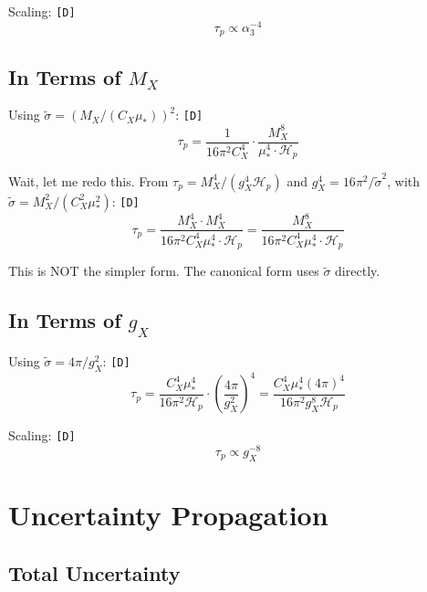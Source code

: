 \documentclass[11pt,a4paper]{article}
\newcommand{\tagD}{\textcolor{green!50!black}{\texttt{[D]}}}
\theoremstyle{definition}
\begin{document}
Scaling: \tagD{}
\begin{equation}
\label{eq:app-alpha3-scale}
\tau_p \propto \alpha_3^{-4}
\end{equation}

\subsection{In Terms of $M_X$}
\label{app:mx-param}

Using $\tilde{\sigma} = (M_X/(C_X\mu_*))^2$: \tagD{}
\begin{equation}
\label{eq:app-mx-tau}
\tau_p = \frac{1}{16\pi^2 C_X^4} \cdot \frac{M_X^8}{\mu_*^4 \cdot \mathcal{H}_p}
\end{equation}

Wait, let me redo this. From $\tau_p = M_X^4/(g_X^4 \mathcal{H}_p)$ and $g_X^4 = 16\pi^2/\tilde{\sigma}^2$,
with $\tilde{\sigma} = M_X^2/(C_X^2\mu_*^2)$: \tagD{}
\begin{equation}
\label{eq:app-mx-tau-2}
\tau_p = \frac{M_X^4 \cdot M_X^4}{16\pi^2 C_X^4 \mu_*^4 \cdot \mathcal{H}_p} = \frac{M_X^8}{16\pi^2 C_X^4 \mu_*^4 \cdot \mathcal{H}_p}
\end{equation}

This is NOT the simpler form. The canonical form uses $\tilde{\sigma}$ directly.

\subsection{In Terms of $g_X$}
\label{app:gx-param}

Using $\tilde{\sigma} = 4\pi/g_X^2$: \tagD{}
\begin{equation}
\label{eq:app-gx-tau}
\tau_p = \frac{C_X^4 \mu_*^4}{16\pi^2 \mathcal{H}_p} \cdot \left(\frac{4\pi}{g_X^2}\right)^4 = \frac{C_X^4 \mu_*^4 (4\pi)^4}{16\pi^2 g_X^8 \mathcal{H}_p}
\end{equation}

Scaling: \tagD{}
\begin{equation}
\label{eq:app-gx-scale}
\tau_p \propto g_X^{-8}
\end{equation}

\section{Uncertainty Propagation}
\label{app:uncertainty}

\subsection{Total Uncertainty}
\label{app:total-unc}
\end{document}

